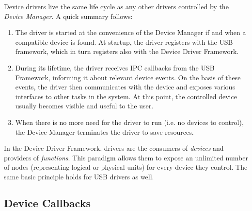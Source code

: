 Device drivers live the same life cycle as any other drivers controlled by the
\textit{Device Manager}. A quick summary follows:
~
\begin{enumerate}
	\item The driver is started at the convenience of the Device Manager if and
	when a compatible device is found. At startup, the driver registers with the
	USB framework, which in turn registers also with the Device Driver
	Framework.

	\item During its lifetime, the driver receives IPC callbacks from the USB
	Framework, informing it about relevant device events. On the basis of these
	events, the driver then communicates with the device and exposes various
	interfaces to other tasks in the system. At this point, the controlled
	device usually becomes visible and useful to the user.

	\item When there is no more need for the driver to run (i.e. no devices to
	control), the Device Manager terminates the driver to save resources.
\end{enumerate}

In the Device Driver Framework, drivers are the consumers of \textit{devices}
and providers of \textit{functions}. This paradigm allows them to expose an
unlimited number of nodes (representing logical or physical units) for every
device they control. The same basic principle holds for USB drivers as well.


\subsection{Device Callbacks}

